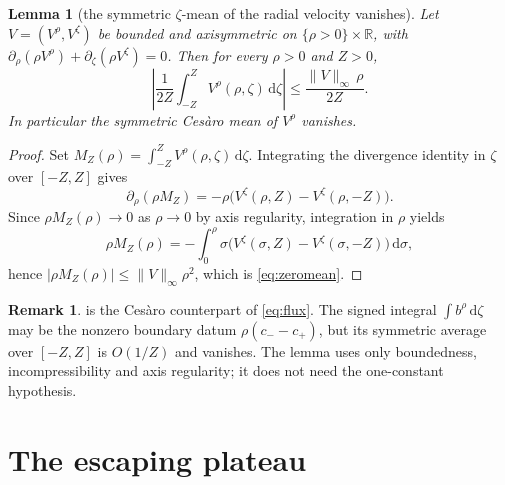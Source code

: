 \documentclass[11pt]{article}
\newtheorem{lemma}[theorem]{Lemma}
\theoremstyle{definition}
\newtheorem{remark}[theorem]{Remark}
\newcommand{\R}{\mathbb{R}}
\newcommand{\dd}{\,\mathrm{d}}
\begin{document}
\begin{lemma}[the symmetric $\zeta$-mean of the radial velocity vanishes]
\label{lem:zeromean}
Let $V=(V^\rho,V^\zeta)$ be bounded and axisymmetric on
$\{\rho>0\}\times\R$, with
$\partial_\rho(\rho V^\rho)+\partial_\zeta(\rho V^\zeta)=0$. Then for every
$\rho>0$ and $Z>0$,
\begin{equation}\label{eq:zeromean}
\left|\frac{1}{2Z}\int_{-Z}^{Z}V^\rho(\rho,\zeta)\dd\zeta\right|
\le \frac{\|V\|_\infty\,\rho}{2Z}.
\end{equation}
In particular the symmetric Ces\`aro mean of $V^\rho$ vanishes.
\end{lemma}
\begin{proof}
Set $M_Z(\rho)=\int_{-Z}^{Z}V^\rho(\rho,\zeta)\dd\zeta$. Integrating the
divergence identity in $\zeta$ over $[-Z,Z]$ gives
\begin{equation}
\partial_\rho(\rho M_Z)
=-\rho\bigl(V^\zeta(\rho,Z)-V^\zeta(\rho,-Z)\bigr).
\end{equation}
Since $\rho M_Z(\rho)\to0$ as $\rho\to0$ by axis regularity, integration in
$\rho$ yields
\begin{equation}
\rho M_Z(\rho)
=-\int_0^\rho \sigma\bigl(V^\zeta(\sigma,Z)-V^\zeta(\sigma,-Z)\bigr)\dd\sigma,
\end{equation}
hence $|\rho M_Z(\rho)|\le \|V\|_\infty\rho^2$, which is
\eqref{eq:zeromean}.
\end{proof}

\begin{remark}
 is the Ces\`aro counterpart of \eqref{eq:flux}. The signed
integral $\int b^\rho\dd\zeta$ may be the nonzero boundary datum
$\rho(c_--c_+)$, but its symmetric average over $[-Z,Z]$ is $O(1/Z)$ and
vanishes. The lemma uses only boundedness, incompressibility and axis
regularity; it does not need the one-constant hypothesis.
\end{remark}

\section{The escaping plateau}
\end{document}

